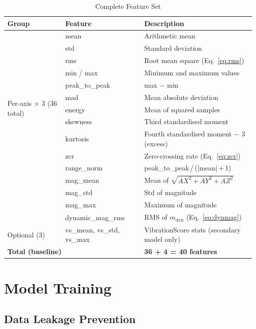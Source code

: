 \documentclass[12pt,a4paper]{report}
\begin{document}
\begin{table}[H]
  \centering
  \caption{Complete Feature Set}
  \label{tab:features}
  \begin{tabular}{llp{7cm}}
    \toprule
    \textbf{Group} & \textbf{Feature} & \textbf{Description} \\
    \midrule
    \multirow{12}{*}{Per-axis $\times$ 3 (36 total)} &
      mean          & Arithmetic mean \\
    & std           & Standard deviation \\
    & rms           & Root mean square (Eq.~\ref{eq:rms}) \\
    & min / max     & Minimum and maximum values \\
    & peak\_to\_peak & max $-$ min \\
    & mad           & Mean absolute deviation \\
    & energy        & Mean of squared samples \\
    & skewness      & Third standardised moment \\
    & kurtosis      & Fourth standardised moment $-$ 3 (excess) \\
    & zcr           & Zero-crossing rate (Eq.~\ref{eq:zcr}) \\
    & range\_norm   & peak\_to\_peak\,/\,(|mean|\,+\,1) \\
    \midrule
    \multirow{4}{*}{Magnitude (4)} &
      mag\_mean        & Mean of $\sqrt{AX^2+AY^2+AZ^2}$ \\
    & mag\_std         & Std of magnitude \\
    & mag\_max         & Maximum of magnitude \\
    & dynamic\_mag\_rms & RMS of $m_\text{dyn}$ (Eq.~\ref{eq:dynmag}) \\
    \midrule
    Optional (3) &
      vs\_mean, vs\_std, vs\_max & VibrationScore stats (secondary model only) \\
    \midrule
    \multicolumn{2}{l}{\textbf{Total (baseline)}} & \textbf{36 + 4 = 40 features} \\
    \bottomrule
  \end{tabular}
\end{table}

\section{Model Training}

\subsection{Data Leakage Prevention}
\end{document}
